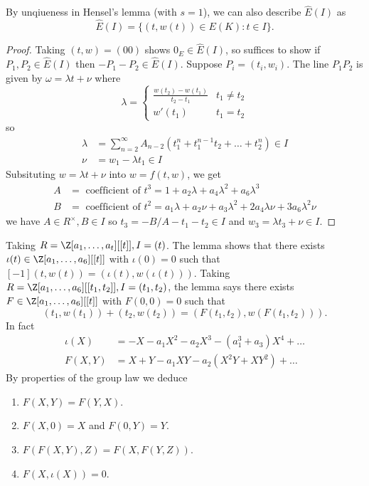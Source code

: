 \documentclass[a4paper]{article}
\theoremstyle{definition}
\theoremstyle{theorem}
\begin{document}
\begin{remark}
  By unqiueness in Hensel's lemma (with \(s = 1\)), we can also describe \(\hat E(I)\) as
  \[
    \hat E(I) = \{(t, w(t)) \in E(K): t \in I\}.
  \]
\end{remark}

\begin{proof}
  Taking \((t, w) = (0 0)\) shows \(0_E \in \hat E(I)\), so suffices to show if \(P_1, P_2 \in \hat E(I)\) then \(-P_1 - P_2 \in \hat E(I)\). Suppose \(P_i = (t_i, w_i)\). The line \(P_1P_2\) is given by \(\omega = \lambda t + \nu\) where
  \[
    \lambda =
    \begin{cases}
      \frac{w(t_2) - w(t_1)}{t_2 - t_1} & t_1 \neq t_2 \\
      w'(t_1) & t_1 = t_2
    \end{cases}
  \]
  so
  \begin{align*}
    \lambda &= \sum_{n = 2}^\infty A_{n - 2}(t_1^n + t_1^{n - 1}t_2 + \dots + t_2^n) \in I \\
    \nu &= w_1 - \lambda t_1 \in I
  \end{align*}
  Subsituting \(w = \lambda t + \nu\) into \(w = f(t, w)\), we get
  \begin{align*}
    A &= \text{ coefficient of } t^3 = 1 + a_2 \lambda + a_4 \lambda^2 + a_6 \lambda^3 \\
    B &= \text{ coefficient of } t^2 = a_1 \lambda + a_2 \nu + a_3 \lambda^2 + 2a_4 \lambda \nu + 3a_6 \lambda^2 \nu
  \end{align*}
  we have \(A \in R^\times, B \in I\) so \(t_3 = -B/A - t_1 - t_2 \in I\) and \(w_3 = \lambda t_3 + \nu \in I\).
\end{proof}

Taking \(R = \Z[a_1, \dots, a_t][[t]], I = (t)\). The lemma shows that there exists \(\iota(t) \in \Z[a_1, \dots, a_6][[t]]\) with \(\iota(0) = 0\) such that \([-1] (t, w(t)) = (\iota(t), w(\iota(t)))\). Taking \(R = \Z[a_1, \dots, a_6][[t_1, t_2]], I = (t_1, t_2)\), the lemma says there exists \(F \in \Z[a_1, \dots, a_6][[t]]\) with \(F(0, 0) = 0\) such that
\[
  (t_1, w(t_1)) + (t_2, w(t_2)) = (F(t_1, t_2), w(F(t_1, t_2))).
\]
In fact
\begin{align*}
  \iota(X) &= - X - a_1X^2 - a_2X^3 - (a_1^3 + a_3) X^4 + \dots \\
  F(X, Y) &= X + Y - a_1XY - a_2(X^2Y + XY^2) + \dots
\end{align*}
By properties of the group law we deduce
\begin{enumerate}
\item \(F(X, Y) = F(Y, X)\).
\item \(F(X, 0) = X\) and \(F(0, Y) = Y\).
\item \(F(F(X, Y), Z) = F(X, F(Y, Z))\).
\item \(F(X, \iota(X)) = 0\).
\end{enumerate}
\end{document}
